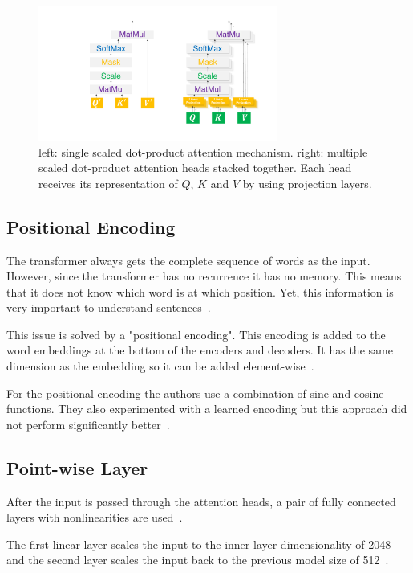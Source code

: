 \begin{figure}[htp]
	\centering
	\includegraphics[width=0.7\textwidth]{figures/03_theory/03_transformer_ScaledDot}
	\caption{left: single scaled dot-product attention mechanism. right: multiple scaled dot-product attention heads stacked together. Each head receives its representation of $Q$, $K$ and $V$ by using projection layers.}
	\label{fig:03_transformer_scaledDotProduct}
\end{figure}

\subsection{Positional Encoding}

The transformer always gets the complete sequence of words as the input. However, since the transformer has no recurrence it has no memory. This means that it does not know which word is at which position. Yet, this information is very important to understand sentences~\cite{Vaswani2017d}. 
\medskip

This issue is solved by a "positional encoding". This encoding is added to the word embeddings at the bottom of the encoders and decoders. It has the same dimension as the embedding so it can be added element-wise~\cite{Vaswani2017d}.

For the positional encoding the authors use a combination of sine and cosine functions. They also experimented with a learned encoding but this approach did not perform significantly better~\cite{Vaswani2017d}.

\subsection{Point-wise Layer}

After the input is passed through the attention heads, a pair of fully connected layers with nonlinearities are used~\cite{Vaswani2017d}. 

The first linear layer scales the input to the inner layer dimensionality of 2048 and the second layer scales the input back to the previous model size of 512~\cite{Vaswani2017d}.

